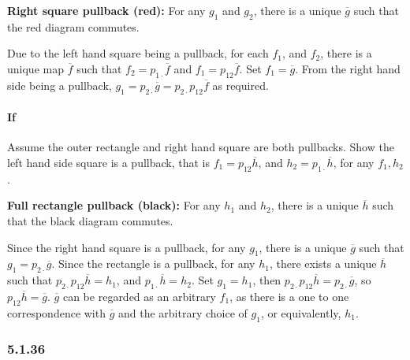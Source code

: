 \documentclass{article}
\begin{document}
\textbf{Right square pullback (red):}  For any $g_1$ and $g_2$, there is a unique $\overline{g}$ such that the red diagram commutes.

Due to the left hand square being a pullback, for each $f_1$, and $f_2$, there is a unique map $\overline{f}$ such that $f_2 = p_{1\cdot}\overline{f}$ and $f_1 = p_{12}\overline{f}$. Set $f_1 = \overline{g}$.   From the right hand side being a pullback,  $g_1 = p_{2\cdot}\overline{g}=p_{2\cdot}p_{12}\overline{f}$ as required.

\paragraph{If}

Assume the outer rectangle and right hand square are both pullbacks. Show the left hand side square is a pullback, that is $f_1 = p_{12}\overline{h}$, and $h_2=p_{1\cdot}\overline{h}$, for any $f_1,  h_2$.


\textbf{Full rectangle pullback (black):}  For any $h_1$ and $h_2$, there is a unique $\overline{h}$ such that the black diagram commutes.

Since the right hand square is a pullback, for any $g_1$, there is a unique $\overline{g}$ such that $g_1 = p_{2\cdot}\overline{g}$. Since the rectangle is a pullback, for any $h_1$, there exists a unique $\overline{h}$ such that $p_{2\cdot}p_{12}\overline{h} = h_1$, and $p_{1\cdot}\overline{h} = h_2$. Set $g_1=h_1$, then $p_{2\cdot}p_{12}\overline{h} = p_{2\cdot}\overline{g}$, so $p_{12}\overline{h} = \overline{g}$. $\overline{g}$ can be regarded as an arbitrary $f_1$, as there is a one to one correspondence with $\overline{g}$ and the arbitrary choice of $g_1$, or equivalently, $h_1$.

\subsubsection*{5.1.36}
\end{document}
